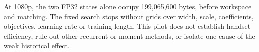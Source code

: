 At 1080p, the two FP32 states alone occupy 199,065,600 bytes, before
workspace and matching. The fixed search stops without grids over width,
scale, coefficients, objectives, learning rate or training length.
This pilot does not establish handset efficiency, rule out other
recurrent or moment methods, or isolate one cause of the weak historical
effect.
